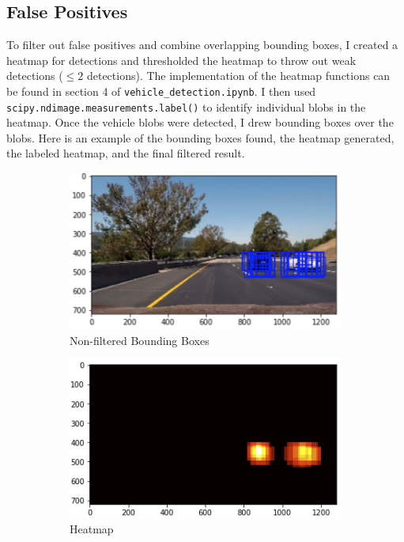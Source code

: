 \documentclass[12pt]{article}
\begin{document}
\subsection{False Positives}
To filter out false positives and combine overlapping bounding boxes, I created a heatmap for detections and thresholded the heatmap to throw out weak detections ($\le 2$ detections). The implementation of the heatmap functions can be found in section 4 of \texttt{vehicle\_detection.ipynb}. I then used \texttt{scipy.ndimage.measurements.label()} to identify individual blobs in the heatmap. Once the vehicle blobs were detected, I drew bounding boxes over the blobs. Here is an example of the bounding boxes found, the heatmap generated, the labeled heatmap, and the final filtered result.
\begin{figure}[!h]
\centering
\begin{subfigure}{0.495\textwidth}
\centering
\includegraphics[scale=0.6]{example1.png}
\caption{Non-filtered Bounding Boxes}
\end{subfigure}
\begin{subfigure}{0.495\textwidth}
\centering
\includegraphics[scale=0.6]{heatmap_ex1.png}
\caption{Heatmap}
\end{subfigure}
\begin{subfigure}{0.495\textwidth}

\end{subfigure}
\end{figure}
\end{document}
